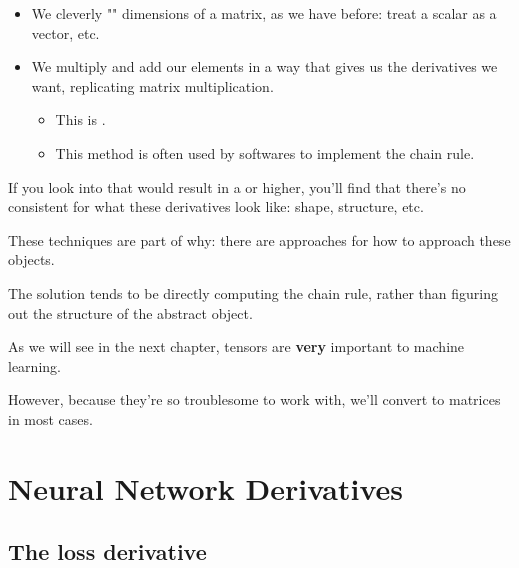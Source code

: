 \begin{itemize}
            \item We cleverly "" dimensions of a matrix, as we have before: treat a scalar as a vector, etc.
            
            \item We  multiply and add our elements in a way that gives us the derivatives we want, replicating matrix multiplication.
                \begin{itemize}
                    \item This is .
                    \item This method is often used by softwares to implement the chain rule.\\
                \end{itemize}
        \end{itemize}
        
        \begin{clarification}
            If you look into  that would result in a  or higher, you'll find that there's no consistent  for what these derivatives look like: shape, structure, etc.
            
            These techniques are part of why: there are  approaches for how to approach these objects.

            The solution tends to be directly computing the chain rule, rather than figuring out the structure of the abstract object.
        \end{clarification}
        
        As we will see in the next chapter, tensors are \textbf{very} important to machine learning. 
        
        However, because they're so troublesome to work with, we'll convert to matrices in most cases.
    
    \secdiv

\pagebreak
\section{Neural Network Derivatives}
        
    \subsection{The loss derivative}
    
